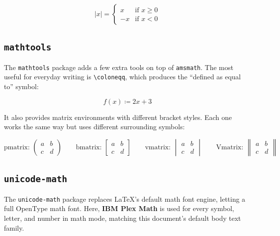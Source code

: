 		\begin{equation}
			|x| = \begin{cases}
				x  & \text{if } x \geq 0 \\
				-x & \text{if } x < 0
			\end{cases}
		\end{equation}
		
	\subsection{\texttt{mathtools}}
	The \texttt{mathtools} package adds a few extra tools on top of \texttt{amsmath}. The most useful for everyday writing is \texttt{\textbackslash coloneqq}, which produces the ``defined as equal to'' symbol:
	
	\begin{equation}
		f(x) \coloneqq 2x + 3
	\end{equation}
	
	It also provides matrix environments with different bracket styles. Each one works the same way but uses different surrounding symbols:
	
	\begin{equation}
		\text{pmatrix: }
		\begin{pmatrix} a & b \\ c & d \end{pmatrix} \qquad
		\text{bmatrix: }
		\begin{bmatrix} a & b \\ c & d \end{bmatrix} \qquad
		\text{vmatrix: }
		\begin{vmatrix} a & b \\ c & d \end{vmatrix} \qquad
		\text{Vmatrix: }
		\begin{Vmatrix} a & b \\ c & d \end{Vmatrix}
	\end{equation}
	
	\subsection{\texttt{unicode-math}}
	The \texttt{unicode-math} package replaces \LaTeX{}'s default math font engine, letting a full OpenType math font. Here, \textbf{IBM Plex Math} is used for every symbol, letter, and number in math mode, matching this document's default body text family.
	
